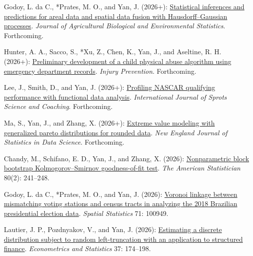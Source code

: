 \begin{RefereedJournalArticles}

\item *Godoy, L. da C., *Prates, M. O., and Yan, J.
(2026+): \href{https://doi.org/10.1007/s13253-025-00720-7}{Statistical
inferences and predictions for areal data and spatial data fusion with
Hausdorff--Gaussian processes}. \emph{Journal of Agricultural Biological
and Environmental Statistics}. Forthcoming.

\item Hunter, A. A., Sacco, S., *Xu, Z., Chen, K., Yan, J., and
Aseltine, R. H. (2026+):
\href{https://doi.org/10.1136/ip-2025-046076}{Preliminary development of
a child physical abuse algorithm using emergency department records}.
\emph{Injury Prevention}. Forthcoming.

\item *Lee, J., Smith, D., and Yan, J. (2026+):
\href{https://doi.org/10.1177/17479541261460290}{Profiling NASCAR
qualifying performance with functional data analysis}.
\emph{International Journal of Sprots Science and Coaching}.
Forthcoming.

\item *Ma, S., Yan, J., and Zhang, X. (2026+):
\href{https://doi.org/10.51387/26-NEJSDS101}{Extreme value modeling with
generalized pareto distributions for rounded data}. \emph{New England
Journal of Statistics in Data Science}. Forthcoming.

\item *Chandy, M., Schifano, E. D., Yan, J., and Zhang, X. (2026):
\href{https://doi.org/10.1080/00031305.2025.2588131}{Nonparametric block
bootstrap Kolmogorov--Smirnov goodness-of-fit test}. \emph{The American
Statistician} 80(2): 241--248.

\item *Godoy, L. da C., *Prates, M. O., and Yan, J.
(2026): \href{https://doi.org/10.1016/j.spasta.2025.100949}{Voronoi
linkage between mismatching voting stations and census tracts in
analyzing the 2018 Brazilian presidential election data}. \emph{Spatial
Statistics} 71: 100949.

\item *Lautier, J. P., Pozdnyakov, V., and Yan, J. (2026):
\href{https://doi.org/10.1016/j.ecosta.2023.05.005}{Estimating a
discrete distribution subject to random left-truncation with an
application to structured finance}. \emph{Econometrics and Statistics}
37: 174--198.


\end{RefereedJournalArticles}
